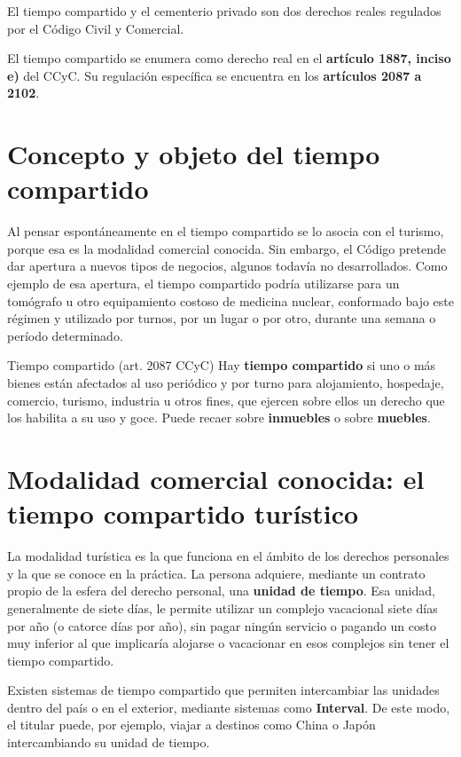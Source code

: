 \documentclass[12pt,oneside]{book}
\begin{document}
El tiempo compartido y el cementerio privado son dos derechos reales regulados por el Código Civil y Comercial.

\begin{important}
El tiempo compartido se enumera como derecho real en el \textbf{artículo 1887, inciso e)} del CCyC. Su regulación específica se encuentra en los \textbf{artículos 2087 a 2102}.
\end{important}

\section{Concepto y objeto del tiempo compartido}

Al pensar espontáneamente en el tiempo compartido se lo asocia con el turismo, porque esa es la modalidad comercial conocida. Sin embargo, el Código pretende dar apertura a nuevos tipos de negocios, algunos todavía no desarrollados. Como ejemplo de esa apertura, el tiempo compartido podría utilizarse para un tomógrafo u otro equipamiento costoso de medicina nuclear, conformado bajo este régimen y utilizado por turnos, por un lugar o por otro, durante una semana o período determinado.

\begin{definition}{Tiempo compartido (art. 2087 CCyC)}
Hay \textbf{tiempo compartido} si uno o más bienes están afectados al uso periódico y por turno para alojamiento, hospedaje, comercio, turismo, industria u otros fines, que ejercen sobre ellos un derecho que los habilita a su uso y goce. Puede recaer sobre \textbf{inmuebles} o sobre \textbf{muebles}.
\end{definition}

\section{Modalidad comercial conocida: el tiempo compartido turístico}

La modalidad turística es la que funciona en el ámbito de los derechos personales y la que se conoce en la práctica. La persona adquiere, mediante un contrato propio de la esfera del derecho personal, una \textbf{unidad de tiempo}. Esa unidad, generalmente de siete días, le permite utilizar un complejo vacacional siete días por año (o catorce días por año), sin pagar ningún servicio o pagando un costo muy inferior al que implicaría alojarse o vacacionar en esos complejos sin tener el tiempo compartido.

Existen sistemas de tiempo compartido que permiten intercambiar las unidades dentro del país o en el exterior, mediante sistemas como \textbf{Interval}. De este modo, el titular puede, por ejemplo, viajar a destinos como China o Japón intercambiando su unidad de tiempo.
\end{document}
